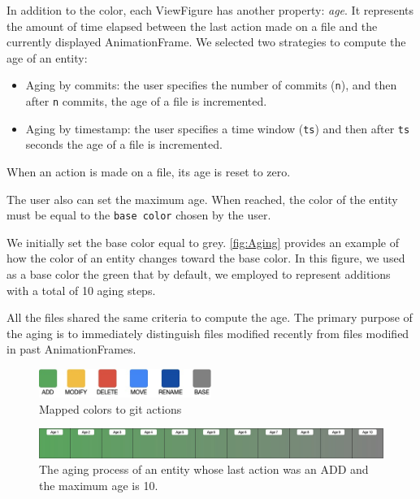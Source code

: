 In addition to the color, each ViewFigure has another property: \textit{age}. It represents the amount of time elapsed between the last action made on a file and the currently displayed AnimationFrame. 
We selected two strategies to compute the age of an entity:

\begin{itemize}
    \item{Aging by commits}: the user specifies the number of commits (\texttt{n}), and then after \texttt{n} commits, the age of a file is incremented. 
    \item{Aging by timestamp}:  the user specifies a time window (\texttt{ts}) and then after \texttt{ts} seconds the age of a file is incremented.
\end{itemize}

When an action is made on a file, its age is reset to zero. 

The user also can set the maximum age.
When reached, the color of the entity must be equal to the \texttt{base color} chosen by the user.
 
We initially set the base color equal to grey.
\autoref{fig:Aging} provides an example of how the color of an entity changes toward the base color. In this figure, we used as a base color the green that by default, we employed to represent additions with a total of 10 aging steps. 


All the files shared the same criteria to compute the age. The primary purpose of the aging is to immediately distinguish files modified recently from files modified in past AnimationFrames.

\begin{figure}
    \center
    \includegraphics[width=0.5\textwidth]{ColorMapping.jpg}
    \caption{Mapped colors to git actions}
    \label{fig:ColorAssociation}
\end{figure}


\begin{figure}
    \center
    \includegraphics[width=\textwidth]{Aging.jpg}
    \caption{The aging process of an entity whose last action was an ADD and the maximum age is 10. }
    \label{fig:Aging}
\end{figure}



